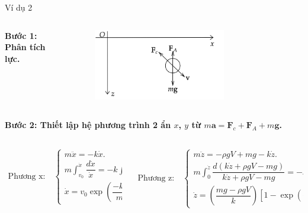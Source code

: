 \begin{frame}{Ví dụ 2}
\begin{columns}
    \begin{column}{0.5\textwidth}
\textbf{Bước 1: Phân tích lực.}
\end{column}
    \begin{column}{0.5\textwidth}  
\begin{figure}
    \centering
    \includegraphics[width=0.7\textwidth]{Slides/Figure/masatnhot1.png}
\end{figure}
\end{column}
\end{columns}
\textbf{Bước 2: Thiết lập hệ phương trình 2 ẩn \(x\), \(y\) từ \(m\mathbf a=\mathbf F_c+\mathbf F_A+m\mathbf g\).}
\scriptsize
\begin{columns}
\begin{column}{0.5\textwidth}
\begin{align*}
    \text{Phương x:}\quad
    \begin{cases}
    m\ddot{x} = -k\dot{x}. \\
    m\int_{v_0}^{\dot{x}} \dfrac{d\dot x}{\dot x} = -k\int_0^t dt. \\
    \dot x=v_0 \exp(\dfrac{-kt}{m}).
    \end{cases}
\end{align*}
\end{column}
\begin{column}{0.5\textwidth}
\begin{align*}
    \text{Phương z:}\quad
    \begin{cases}    
    m\ddot{z} = -\rho g V + mg - k\dot{z}. \\
    m\int_{0}^{\dot z} \dfrac{d(k\dot z+\rho g V-mg)}{k\dot z+\rho g V-mg} =-k\int_0^t dt.\\
    \dot{z} = \left(\dfrac{mg - \rho g V}{k}\right)\left[1 - \exp\left(-\frac{k t}{m}\right)\right].
    \end{cases}
\end{align*}
\end{column}
\end{columns}
\normalsize
\end{frame}

